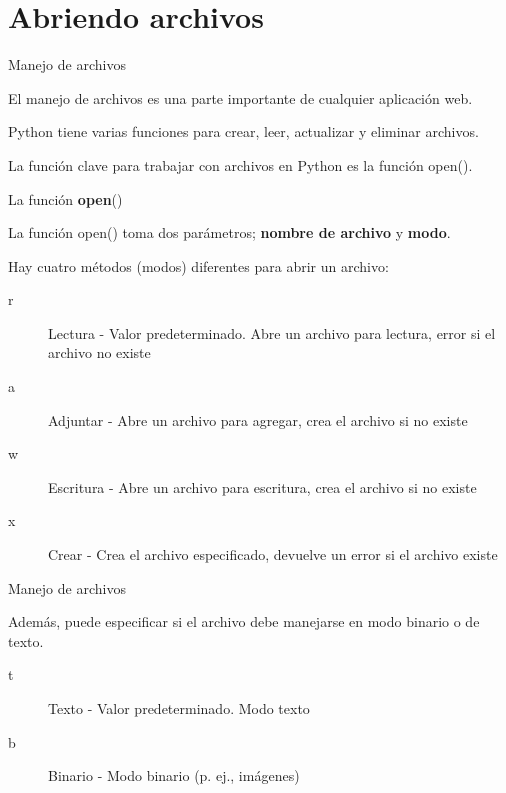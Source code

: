 
\section{Abriendo archivos}

\begin{frame}[c]{Manejo de archivos}

  El manejo de archivos es una parte importante de cualquier
  aplicación web.

  \vspace{\baselineskip}
  Python tiene varias funciones para crear, leer, actualizar y
  eliminar archivos.

  \vspace{\baselineskip}
  La función clave para trabajar con archivos en Python es la
  función \textcolor{codeKeyword}{open}().
\end{frame}

\begin{frame}[c]{La función \textbf{open}()}

  La función \textcolor{codeKeyword}{open}() toma dos parámetros;
  \textbf{nombre de archivo} y \textbf{modo}.

  \vspace{\baselineskip}
  Hay cuatro métodos (modos) diferentes para abrir un archivo: 

  \vspace{\baselineskip}
  \begin{description}
    \item[r] Lectura - Valor predeterminado. Abre un archivo para
      lectura, error si el archivo no existe
    \pausa
    \item[a] Adjuntar - Abre un archivo para agregar, crea el
      archivo si no existe
    \pausa
    \item[w] Escritura - Abre un archivo para escritura, crea el
      archivo si no existe
    \pausa
    \item[x] Crear - Crea el archivo especificado, devuelve un error
      si el archivo existe
  \end{description}
\end{frame}

\begin{frame}[c]{Manejo de archivos}

  Además, puede especificar si el archivo debe manejarse en
  modo binario o de texto.

  \vspace{\baselineskip}
  \begin{description}
    \item[t] Texto - Valor predeterminado. Modo texto
    \pausa
    \item[b] Binario - Modo binario (p. ej., imágenes)
  \end{description}
\end{frame}


